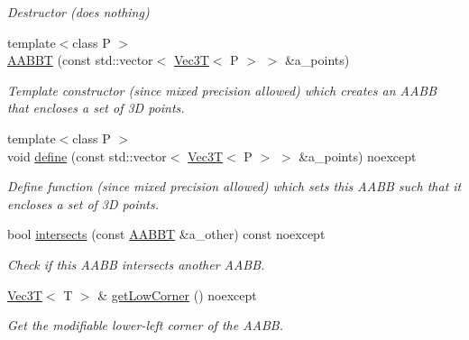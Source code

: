 \begin{DoxyCompactItemize}
\begin{DoxyCompactList}\small\item\em Destructor (does nothing) \end{DoxyCompactList}\item 
{\footnotesize template$<$class P $>$ }\\\hyperlink{classEBGeometry_1_1BoundingVolumes_1_1AABBT_a81b76c881d564ac8a8a2b98f90a0319d}{A\+A\+B\+BT} (const std\+::vector$<$ \hyperlink{classVec3T}{Vec3T}$<$ P $>$ $>$ \&a\+\_\+points)
\begin{DoxyCompactList}\small\item\em Template constructor (since mixed precision allowed) which creates an A\+A\+BB that encloses a set of 3D points. \end{DoxyCompactList}\item 
{\footnotesize template$<$class P $>$ }\\void \hyperlink{classEBGeometry_1_1BoundingVolumes_1_1AABBT_a71467f66f1d9c1622c750273ca79946a}{define} (const std\+::vector$<$ \hyperlink{classVec3T}{Vec3T}$<$ P $>$ $>$ \&a\+\_\+points) noexcept
\begin{DoxyCompactList}\small\item\em Define function (since mixed precision allowed) which sets this A\+A\+BB such that it encloses a set of 3D points. \end{DoxyCompactList}\item 
bool \hyperlink{classEBGeometry_1_1BoundingVolumes_1_1AABBT_a15e8b77c18d77e1da267b448e6389aff}{intersects} (const \hyperlink{classEBGeometry_1_1BoundingVolumes_1_1AABBT}{A\+A\+B\+BT} \&a\+\_\+other) const noexcept
\begin{DoxyCompactList}\small\item\em Check if this A\+A\+BB intersects another A\+A\+BB. \end{DoxyCompactList}\item 
\mbox{\label{classEBGeometry_1_1BoundingVolumes_1_1AABBT_a850d3d2ffb1afd39ad29f2c3a40bcfc9}} 
\hyperlink{classVec3T}{Vec3T}$<$ T $>$ \& \hyperlink{classEBGeometry_1_1BoundingVolumes_1_1AABBT_a850d3d2ffb1afd39ad29f2c3a40bcfc9}{get\+Low\+Corner} () noexcept
\begin{DoxyCompactList}\small\item\em Get the modifiable lower-\/left corner of the A\+A\+BB. \end{DoxyCompactList}\item 
\mbox{\label{classEBGeometry_1_1BoundingVolumes_1_1AABBT_af18ddf4d7aec12a5815d1a7311d73211}} 

\end{DoxyCompactItemize}
